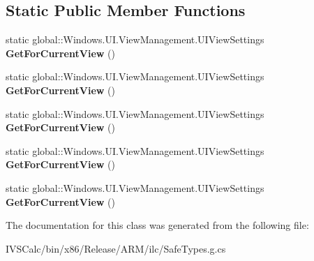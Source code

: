 \subsection*{Static Public Member Functions}
\begin{DoxyCompactItemize}
\item 
\mbox{\label{class_windows_1_1_u_i_1_1_view_management_1_1_u_i_view_settings_ada46eda04ee0bc60e7aad60ca47f7add}} 
static global\+::\+Windows.\+U\+I.\+View\+Management.\+U\+I\+View\+Settings {\bfseries Get\+For\+Current\+View} ()
\item 
\mbox{\label{class_windows_1_1_u_i_1_1_view_management_1_1_u_i_view_settings_ada46eda04ee0bc60e7aad60ca47f7add}} 
static global\+::\+Windows.\+U\+I.\+View\+Management.\+U\+I\+View\+Settings {\bfseries Get\+For\+Current\+View} ()
\item 
\mbox{\label{class_windows_1_1_u_i_1_1_view_management_1_1_u_i_view_settings_ada46eda04ee0bc60e7aad60ca47f7add}} 
static global\+::\+Windows.\+U\+I.\+View\+Management.\+U\+I\+View\+Settings {\bfseries Get\+For\+Current\+View} ()
\item 
\mbox{\label{class_windows_1_1_u_i_1_1_view_management_1_1_u_i_view_settings_ada46eda04ee0bc60e7aad60ca47f7add}} 
static global\+::\+Windows.\+U\+I.\+View\+Management.\+U\+I\+View\+Settings {\bfseries Get\+For\+Current\+View} ()
\item 
\mbox{\label{class_windows_1_1_u_i_1_1_view_management_1_1_u_i_view_settings_ada46eda04ee0bc60e7aad60ca47f7add}} 
static global\+::\+Windows.\+U\+I.\+View\+Management.\+U\+I\+View\+Settings {\bfseries Get\+For\+Current\+View} ()
\end{DoxyCompactItemize}


The documentation for this class was generated from the following file\+:\begin{DoxyCompactItemize}
\item 
I\+V\+S\+Calc/bin/x86/\+Release/\+A\+R\+M/ilc/Safe\+Types.\+g.\+cs\end{DoxyCompactItemize}
